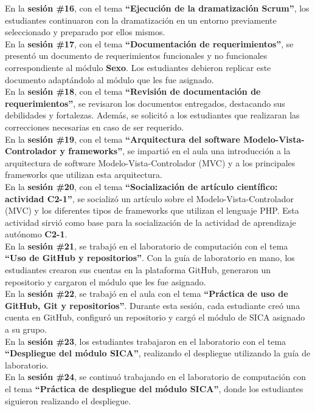 \documentclass[12pt]{article}
\begin{document}
\begin{multicols}{2}
En la \textbf{sesión \#16}, con el tema \textbf{``Ejecución de la dramatización Scrum''}, los estudiantes continuaron con la dramatización en un entorno previamente seleccionado y preparado por ellos mismos.\\
En la \textbf{sesión \#17}, con el tema \textbf{``Documentación de requerimientos''}, se presentó un documento de requerimientos funcionales y no funcionales correspondiente al módulo \textbf{Sexo}. Los estudiantes debieron replicar este documento adaptándolo al módulo que les fue asignado.\\
En la \textbf{sesión \#18}, con el tema \textbf{``Revisión de documentación de requerimientos''}, se revisaron los documentos entregados, destacando sus debilidades y fortalezas. Además, se solicitó a los estudiantes que realizaran las correcciones necesarias en caso de ser requerido.\\
En la \textbf{sesión \#19}, con el tema \textbf{``Arquitectura del software Modelo-Vista-Controlador y frameworks''}, se impartió en el aula una introducción a la arquitectura de software Modelo-Vista-Controlador (MVC) y a los principales frameworks que utilizan esta arquitectura.\\
En la \textbf{sesión \#20}, con el tema \textbf{``Socialización de artículo científico: actividad C2-1''}, se socializó un artículo sobre el Modelo-Vista-Controlador (MVC) y los diferentes tipos de frameworks que utilizan el lenguaje PHP. Esta actividad sirvió como base para la socialización de la actividad de aprendizaje autónomo \textbf{C2-1}.\\
En la \textbf{sesión \#21}, se trabajó en el laboratorio de computación con el tema \textbf{``Uso de GitHub y repositorios''}. Con la guía de laboratorio en mano, los estudiantes crearon sus cuentas en la plataforma GitHub, generaron un repositorio y cargaron el módulo que les fue asignado.\\
En la \textbf{sesión \#22}, se trabajó en el aula con el tema \textbf{``Práctica de uso de GitHub, Git y repositorios''}. Durante esta sesión, cada estudiante creó una cuenta en GitHub, configuró un repositorio y cargó el módulo de SICA asignado a su grupo.\\
En la \textbf{sesión \#23}, los estudiantes trabajaron en el laboratorio con el tema \textbf{``Despliegue del módulo SICA''}, realizando el despliegue utilizando la guía de laboratorio.\\
En la \textbf{sesión \#24}, se continuó trabajando en el laboratorio de computación con el tema \textbf{``Práctica de despliegue del módulo SICA''}, donde los estudiantes siguieron realizando el despliegue.\\

\end{multicols}
\end{document}
